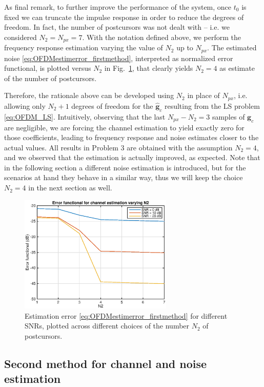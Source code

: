 \documentclass[10pt]{article}
\begin{document}
As final remark, to further improve the performance of the system, once $t_0$ is fixed we can truncate the impulse response in order to reduce the degrees of freedom. In fact, the number of postcursors was not dealt with -- i.e. we considered $N_2 \! = \! N_{px} \! = \! 7$. With the notation defined above, we perform the frequency response estimation varying the value of $N_2$ up to $N_{px}$. The estimated noise \eqref{eq:OFDMestimerror_firstmethod}, interpreted as normalized error functional, is plotted versus $N_2$ in Fig.~\ref{fig:OFDM_chooseN2}, that clearly yields $N_2 = 4$ as estimate of the number of postcursors.

Therefore, the rationale above can be developed using $N_2$ in place of $N_{px}$, i.e. allowing only $N_2 + 1$ degrees of freedom for the $\mathbf{\hat{g}}_c$ resulting from the LS problem \eqref{eq:OFDM_LS}. Intuitively, observing that the last $N_{px} \! - \! N_2 \! = \! 3$ samples of $\mathbf{g}_c$ are negligible, we are forcing the channel estimation to yield exactly zero for those coefficients, leading to frequency response and noise estimates closer to the actual values. All results in Problem 3 are obtained with the assumption $N_2 = 4$, and we observed that the estimation is actually improved, as expected. Note that in the following section a different noise estimation is introduced, but for the scenarios at hand they behave in a similar way, thus we will keep the choice $N_2 = 4$ in the next section as well.

\begin{figure}
	\centering
	\includegraphics[width = 0.65\textwidth]{OFDM_chooseN2}
	\caption{Estimation error \eqref{eq:OFDMestimerror_firstmethod} for different SNRs, plotted across different choices of the number $N_2$ of postcursors.}
	\label{fig:OFDM_chooseN2}
\end{figure}


\subsection*{Second method for channel and noise estimation}
\end{document}
